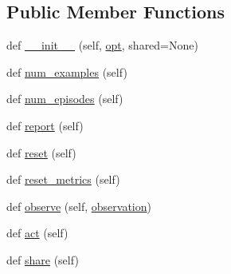 \subsection*{Public Member Functions}
\begin{DoxyCompactItemize}
\item 
def \hyperlink{classparlai_1_1tasks_1_1fvqa_1_1agents_1_1SplitTeacher_a868982c1c3eaca1707b07160bfdc04ad}{\+\_\+\+\_\+init\+\_\+\+\_\+} (self, \hyperlink{classparlai_1_1core_1_1agents_1_1Teacher_a3ce6243860ce978a897922863ed32fa4}{opt}, shared=None)
\item 
def \hyperlink{classparlai_1_1tasks_1_1fvqa_1_1agents_1_1SplitTeacher_a62ae4928ac59b31290846ac15a59c17a}{num\+\_\+examples} (self)
\item 
def \hyperlink{classparlai_1_1tasks_1_1fvqa_1_1agents_1_1SplitTeacher_afb8c188440f9aa2721a308969380f2bc}{num\+\_\+episodes} (self)
\item 
def \hyperlink{classparlai_1_1tasks_1_1fvqa_1_1agents_1_1SplitTeacher_a1dd97916b9ebfa15118857af24da682a}{report} (self)
\item 
def \hyperlink{classparlai_1_1tasks_1_1fvqa_1_1agents_1_1SplitTeacher_a182054c66ca15095740b9c03dad2a4b9}{reset} (self)
\item 
def \hyperlink{classparlai_1_1tasks_1_1fvqa_1_1agents_1_1SplitTeacher_a21e5cdbe5de45eee5098ffcbd0d85151}{reset\+\_\+metrics} (self)
\item 
def \hyperlink{classparlai_1_1tasks_1_1fvqa_1_1agents_1_1SplitTeacher_accfbbfff00298445b8b33dbe5cbfe40f}{observe} (self, \hyperlink{classparlai_1_1core_1_1agents_1_1Agent_aedbecc4b4aa7af7413882a0429e0f1db}{observation})
\item 
def \hyperlink{classparlai_1_1tasks_1_1fvqa_1_1agents_1_1SplitTeacher_a0c33987105d52a1f21c79d9ee9e71b56}{act} (self)
\item 
def \hyperlink{classparlai_1_1tasks_1_1fvqa_1_1agents_1_1SplitTeacher_a9ff9dddf0a570d7c22bdd148e07ad28e}{share} (self)
\end{DoxyCompactItemize}
